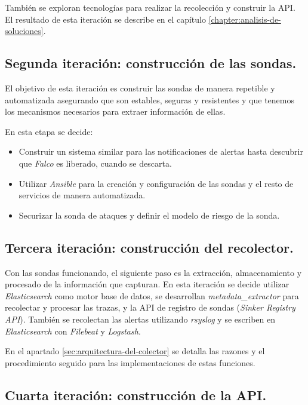 También se exploran tecnologías para realizar la recolección y construir la API. El resultado de esta iteración se describe en
el capítulo \ref{chapter:analisis-de-soluciones}.

\subsection{Segunda iteración: construcción de las sondas.}

El objetivo de esta iteración es construir las sondas de manera repetible y automatizada asegurando que son estables,
seguras y resistentes y que tenemos los mecanismos necesarios para extraer información de ellas.

En esta etapa se decide:

\begin{itemize}
    \item Construir un sistema similar para las notificaciones de alertas hasta descubrir que \emph{Falco} es liberado, cuando se descarta.
    \item Utilizar \emph{Ansible} para la creación y configuración de las sondas y el resto de servicios de manera automatizada.
    \item Securizar la sonda de ataques y definir el modelo de riesgo de la sonda.
\end{itemize}

\subsection{Tercera iteración: construcción del recolector.}

Con las sondas funcionando, el siguiente paso es la extracción, almacenamiento y procesado de la información que capturan. En esta iteración
se decide utilizar \emph{Elasticsearch} como motor base de datos, se desarrollan \emph{metadata\_extractor} para recolectar y procesar las trazas, y 
la API de registro de sondas (\emph{Sinker Registry API}). 
También se recolectan las alertas utilizando \emph{rsyslog} y se escriben en \emph{Elasticsearch}
con \emph{Filebeat} y \emph{Logstash}.

En el apartado \ref{sec:arquitectura-del-colector} se detalla las razones y el procedimiento seguido para las implementaciones de estas funciones.

\subsection{Cuarta iteración: construcción de la API.}

